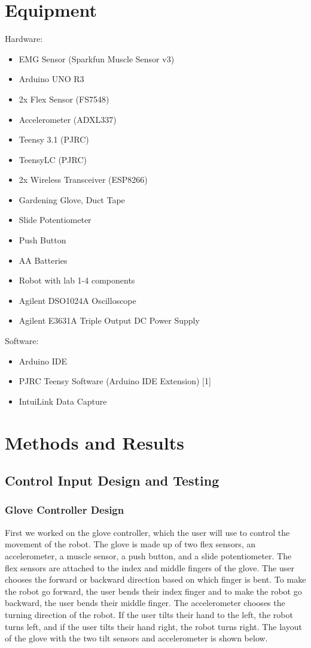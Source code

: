 \documentclass[12pt,scrartcl,titlepage]{article}
\begin{document}
\section{Equipment}
{ 
\noindent Hardware:
  \begin{itemize}
  \item EMG Sensor (Sparkfun Muscle Sensor v3)
  \item Arduino UNO R3
  \item 2x Flex Sensor (FS7548)
  \item Accelerometer (ADXL337)
  \item Teensy 3.1 (PJRC)
  \item TeensyLC (PJRC)
  \item 2x Wireless Transceiver (ESP8266)
  \item Gardening Glove, Duct Tape
  \item Slide Potentiometer
  \item Push Button
  \item AA Batteries
  \item Robot with lab 1-4 components
  \item Agilent DSO1024A Oscilloscope
  \item Agilent E3631A Triple Output DC Power Supply
  \end{itemize}
  
\noindent Software:
  \begin{itemize}
  \item Arduino IDE
  \item PJRC Teensy Software (Arduino IDE Extension) [1]
  \item IntuiLink Data Capture
  \end{itemize}
}
  \section{Methods and Results}

  \subsection{Control Input Design and Testing}

  \subsubsection{Glove Controller Design}

  First we worked on the glove controller, which the user will use to control the movement of the robot. The glove is made up of two flex sensors, an accelerometer, a muscle sensor, a push button, and a slide potentiometer. The flex sensors are attached to the index and middle fingers of the glove. The user chooses the forward or backward direction based on which finger is bent. To make the robot go forward, the user bends their index finger and to make the robot go backward, the user bends their middle finger. The accelerometer chooses the turning direction of the robot. If the user tilts their hand to the left, the robot turns left, and if the user tilts their hand right, the robot turns right. The layout of the glove with the two tilt sensors and accelerometer is shown below.
\end{document}

